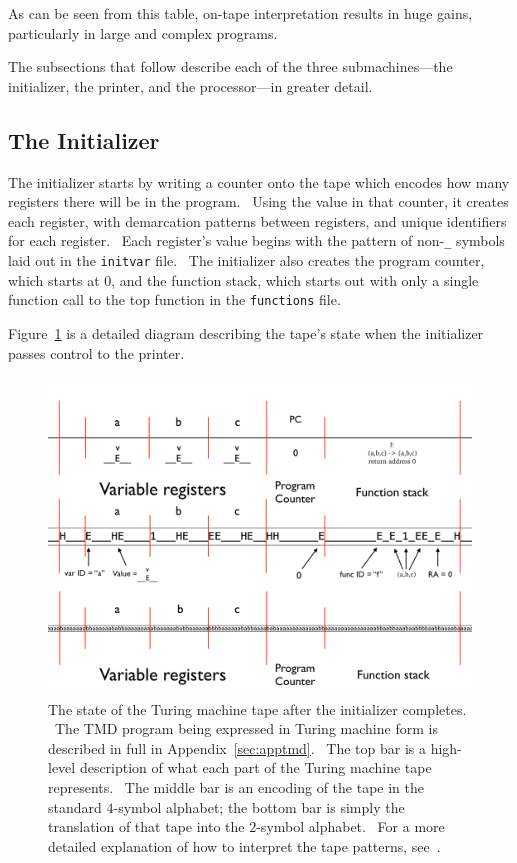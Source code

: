 \documentclass[11pt]{article}
\begin{document}
As can be seen from this table, on-tape interpretation results in huge gains, particularly in large and complex programs.

The subsections that follow describe each of the three submachines---the initializer, the printer, and the processor---in greater detail.

\subsection{The Initializer}

The initializer starts by writing a counter onto the tape which encodes how many registers there will be in the program. \ Using the value in that counter, it creates each register, with demarcation patterns between registers, and unique identifiers for each register. \ Each register's value begins with the pattern of non-\texttt{\_} symbols laid out in the \texttt{initvar} file. \ The initializer also creates the program counter, which starts at 0, and the function stack, which starts out with only a single function call to the top function in the \texttt{functions} file.

Figure~\ref{fig:postinit} is a detailed diagram describing the tape's state when the initializer passes control to the printer.

\begin{figure}
\begin{center}
\includegraphics[scale=0.42]{figs/postinit.png}
\caption{The state of the Turing machine tape after the initializer completes. \ The TMD program being expressed in Turing machine form is described in full in Appendix~\ref{sec:apptmd}. \ The top bar is a high-level description of what each part of the Turing machine tape represents. \ The middle bar is an encoding of the tape in the standard $4$-symbol alphabet; the bottom bar is simply the translation of that tape into the $2$-symbol alphabet. \ For a more detailed explanation of how to interpret the tape patterns, see~\cite{github}. \label{fig:postinit}}
\end{center}
\end{figure}
\end{document}

